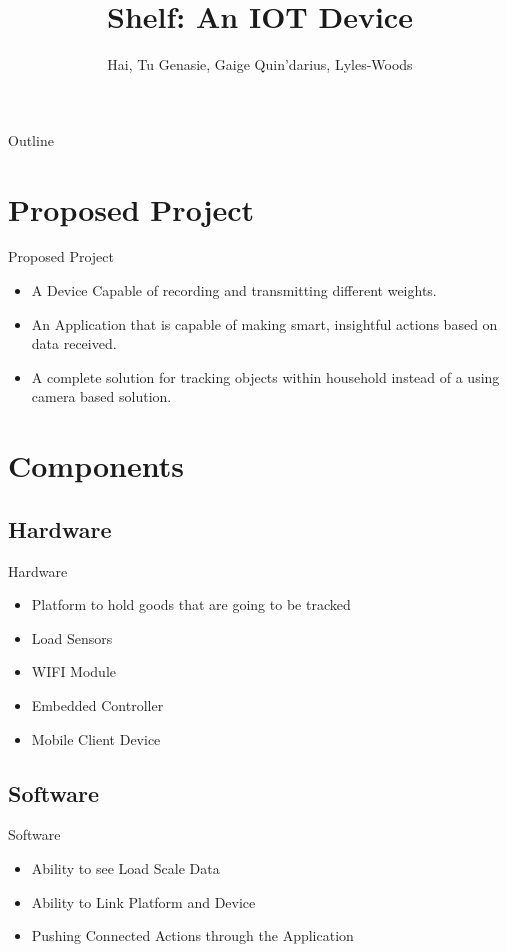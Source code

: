 \documentclass{beamer}
\title{Shelf: An IOT Device}
\author{
	Hai, Tu
	Genasie, Gaige
	Quin'darius, Lyles-Woods
}
\institute{Kennesaw State University}
\begin{document}
\frame{\titlepage}

\begin{frame}{Outline}
	\tableofcontents
\end{frame}

\section{Proposed Project}
\begin{frame}{Proposed Project}
\begin{itemize}
	\item<1-> A Device Capable of recording and transmitting different weights. 		                     \pause
	\item<2-> An Application that is capable of making smart, insightful actions based on data received.     \pause
	\item<3-> A complete solution for tracking objects within household instead of a using camera based solution. \pause
\end{itemize}
\end{frame}

\section{Components}
\subsection{Hardware}
\begin{frame}{Hardware}
\begin{itemize}
	\item<1-> Platform to hold goods that are going to be tracked \pause
	\item<2-> Load Sensors \pause
	\item<3-> WIFI Module \pause
	\item<4-> Embedded Controller \pause
	\item<5-> Mobile Client Device \pause
\end{itemize}
\end{frame}
\subsection{Software}
\begin{frame}{Software}
\begin{itemize}
	\item<1-> Ability to see Load Scale Data \pause
	\item<2-> Ability to Link Platform and Device \pause
	\item<3-> Pushing Connected Actions through the Application \pause
\end{itemize}
\end{frame}
\end{document}
